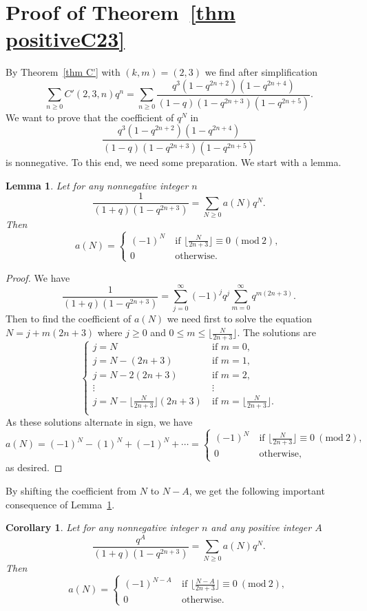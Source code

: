 \documentclass[reqno]{amsart}
\theoremstyle{definition}
\theoremstyle{plain}
\newtheorem{lemma}      {Lemma}
\newtheorem{corollary}  {Corollary}
\theoremstyle{remark}
\numberwithin{equation}{section}
\newcommand{\Mod}[1]{\ (\mathrm{mod}\ #1)}
\newcommand{\fr}{\frac}
\begin{document}
\section{Proof of Theorem~\ref{thm positiveC23}}\label{sec proof thm positiveC23}
By Theorem~\ref{thm C'} with $(k,m)=(2,3)$ we find after simplification
\[
\sum_{n\geq 0} C'(2,3,n)q^n = \sum_{n\geq 0}\fr{q^3(1-q^{2n+2})(1-q^{2n+4})}{(1-q)(1-q^{2n+3})(1-q^{2n+5})}.
\]
We want to prove that the coefficient of $q^N$ in
\[
\fr{q^3(1-q^{2n+2})(1-q^{2n+4})}{(1-q)(1-q^{2n+3})(1-q^{2n+5})}
\]
is nonnegative.
To this end, we need some preparation. We start with a lemma.
\begin{lemma}\label{lem-1 C23}
Let for any nonnegative integer $n$
\[
\fr{1}{(1+q)(1-q^{2n+3})} = \sum_{N\geq 0} a(N) q^N.
\]
Then
\[
a(N) = \begin{cases}
(-1)^N &\ \text{if\ } \lfloor \fr{N}{2n+3} \rfloor \equiv 0\Mod{2}, \\
0 &\ \text{otherwise.}
\end{cases}
\]
\end{lemma}
\begin{proof}
We have
\[
\fr{1}{(1+q)(1-q^{2n+3})}= \sum_{j=0}^\infty (-1)^j q^j \sum_{m=0}^\infty q^{m(2n+3)}.
\]
Then to find the coefficient of $a(N)$ we need first to solve the equation
$N=j+m(2n+3)$ where $j\geq 0$ and $0\leq m \leq \lfloor \fr{N}{2n+3}\rfloor$.
The solutions are
\[
\begin{cases}
j= N &\ \text{if $m=0$}, \\
j=N-(2n+3) &\ \text{if $m=1$}, \\
j=N-2(2n+3) &\ \text{if $m=2$}, \\
\vdots &\ \vdots \\
j=N- \lfloor \fr{N}{2n+3}\rfloor (2n+3) &\ \text{if $m= \lfloor \fr{N}{2n+3}\rfloor$}. \\
\end{cases}
\]
As these solutions alternate in sign, we have
\[
a(N)= (-1)^N - (1)^N + (-1)^N +\cdots
= \begin{cases}
(-1)^N &\ \text{if\ } \lfloor \fr{N}{2n+3} \rfloor \equiv 0\Mod{2}, \\
0 &\ \text{otherwise,}
\end{cases}
\]
as desired.
\end{proof}
By shifting the coefficient from $N$ to $N-A$, we get the following important consequence of Lemma~\ref{lem-1 C23}.
\begin{corollary}\label{cor-1 C23}
Let for any nonnegative integer $n$ and any positive integer $A$
\[
\fr{q^A}{(1+q)(1-q^{2n+3})} = \sum_{N\geq 0} a(N) q^N.
\]
Then
\[
a(N) = \begin{cases}
(-1)^{N-A} &\ \text{if\ } \lfloor \fr{N-A}{2n+3} \rfloor \equiv 0\Mod{2}, \\
0 &\ \text{otherwise.}
\end{cases}
\]
\end{corollary}
\end{document}
